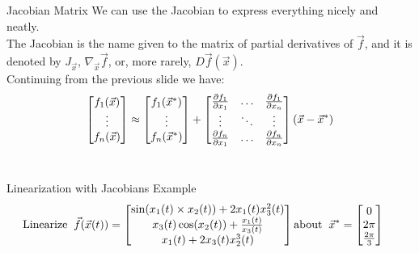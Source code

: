 \begin{frame}{Jacobian Matrix}
We can use the Jacobian to express everything nicely and neatly. \\
The Jacobian is the name given to the matrix of partial derivatives of $\vec{f}$, and it is denoted by $J_{\vec{x}}$, $\nabla_{\vec{x}}\vec{f}$,
or, more rarely, $D\vec{f}(\vec{x})$. \\ \pause
Continuing from the previous slide we have: \\
\[
\begin{bmatrix} f_1(\vec{x}) \\ \vdots \\f_n(\vec{x}) \end{bmatrix} \approx 
\begin{bmatrix} f_1(\vec{x}^*) \\ \vdots \\f_n(\vec{x}^*) \end{bmatrix} + 
\begin{bmatrix} \pdv{f_1}{x_1}(\vec{x}^*)& \hdots& \pdv{f_1}{x_n}(\vec{x}^*) \\ \vdots & \ddots &\vdots \\ \pdv{f_n}{x_1}(\vec{x}^*)& \hdots &  \pdv{f_n}{x_n}(\vec{x}^*) \end{bmatrix}
(\vec{x} - \vec{x}^*)
\]
\\

\end{frame}

\begin{frame}{Linearization with Jacobians Example}
\begin{align*}
    \text{\hspace{-3ex}Linearize}  \hspace{0.2 cm} 
\vec{f}(\vec{x}(t))  = 
\begin{bmatrix}
\sin(x_1(t)\times x_2(t)) + 2x_1(t)x_3^2(t)\\
x_3(t)\cos(x_2(t)) + \frac{x_1(t)}{x_3(t)}\\
x_1(t) + 2x_3(t)x_2^3(t)
\end{bmatrix} 
\text{about} \hspace{0.2 cm} \vec{x}^* = \begin{bmatrix}
0\\ 2 \pi \\ \frac{2 \pi}{3}
\end{bmatrix} 
\end{align*}
\end{frame}

